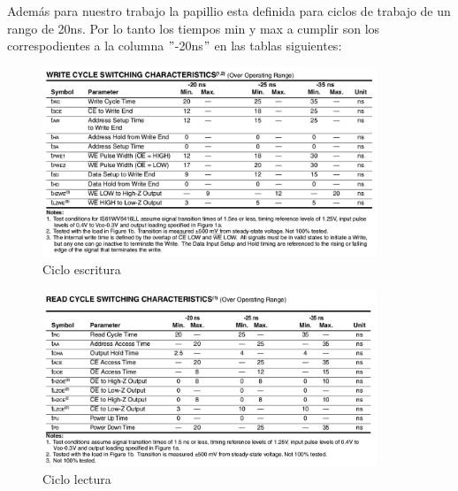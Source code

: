 \documentclass[10pt]{article}
\begin{document}
\newpage

Además para nuestro trabajo la papillio esta definida para ciclos de trabajo de un rango de 20ns. Por lo tanto los tiempos min y max a cumplir son los correspodientes a la columna $"$-20ns$"$ en las tablas siguientes:

\begin{figure}[hbtp]
\centering
\includegraphics[width=10cm]{write-data.png}
\caption{Ciclo escritura}
\label{Cic3}
\end{figure}

\begin{figure}[hbtp]
\centering
\includegraphics[width=10cm]{read-data.png}
\caption{Ciclo lectura}
\label{Cic4}
\end{figure}

\newpage
\end{document}
